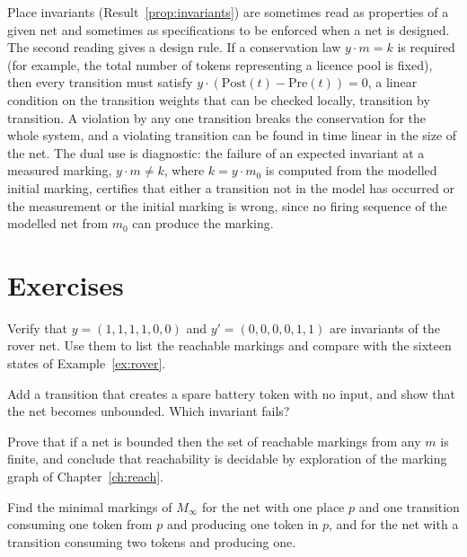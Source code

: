 Place invariants (Result~\ref{prop:invariants}) are sometimes read as properties of a given net and sometimes as specifications to be enforced when a net is designed. The second reading gives a design rule. If a conservation law $y\cdot m=k$ is required (for example, the total number of tokens representing a licence pool is fixed), then every transition must satisfy $y\cdot(\mathrm{Post}(t)-\mathrm{Pre}(t))=0$, a linear condition on the transition weights that can be checked locally, transition by transition. A violation by any one transition breaks the conservation for the whole system, and a violating transition can be found in time linear in the size of the net. The dual use is diagnostic: the failure of an expected invariant at a measured marking, $y\cdot m\ne k$, where $k=y\cdot m_0$ is computed from the modelled initial marking, certifies that either a transition not in the model has occurred or the measurement or the initial marking is wrong, since no firing sequence of the modelled net from $m_0$ can produce the marking.

\section*{Exercises}

\begin{exercise}
Verify that $y=(1,1,1,1,0,0)$ and $y'=(0,0,0,0,1,1)$ are invariants of the rover net. Use them to list the reachable markings and compare with the sixteen states of Example~\ref{ex:rover}.
\end{exercise}

\begin{exercise}
Add a transition that creates a spare battery token with no input, and show that the net becomes unbounded. Which invariant fails?
\end{exercise}

\begin{exercise}
Prove that if a net is bounded then the set of reachable markings from any $m$ is finite, and conclude that reachability is decidable by exploration of the marking graph of Chapter~\ref{ch:reach}.
\end{exercise}

\begin{exercise}
Find the minimal markings of $M_\infty$ for the net with one place $p$ and one transition consuming one token from $p$ and producing one token in $p$, and for the net with a transition consuming two tokens and producing one.
\end{exercise}

